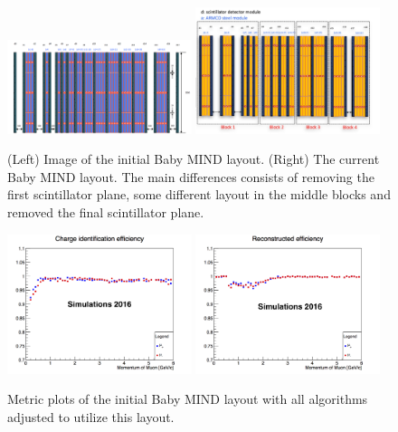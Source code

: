 \begin{figure}[h!]
\centering
\includegraphics[width=0.48\textwidth]{figures/oldStudies/oldMIND.png}
\includegraphics[width=0.48\textwidth]{figures/MIND.jpeg}
\caption{(Left) Image of the initial Baby MIND layout. (Right) The current Baby MIND layout. The main differences consists of removing the first scintillator plane, some different layout in the middle blocks and removed the final scintillator plane.}
\label{fig:oldMIND}
\end{figure}

\begin{figure}[h!]
\centering
\includegraphics[width=0.48\textwidth]{figures/oldStudies/oldChargeID.png}
\includegraphics[width=0.48\textwidth]{figures/oldStudies/oldRecEff.png}
\caption{Metric plots of the initial Baby MIND layout with all algorithms adjusted to utilize this layout.}
\label{fig:oldMIND2}
\end{figure}

